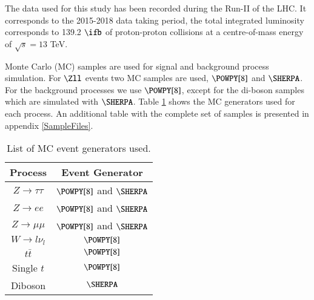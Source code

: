 The data used for this study has been recorded during the Run-II of the LHC. It corresponds to the 2015-2018 data taking period, the total integrated luminosity corresponds to 139.2 $\ifb	$ of proton-proton collisions at a centre-of-mass energy of $\sqrt{s}=13$ TeV.

Monte Carlo (MC) samples are used for signal and background process simulation. For $\Zll$ events two MC samples are used, $\POWPY[8]$ and $\SHERPA$. For the background processes we use $\POWPY[8]$, except for the di-boson samples which are simulated with $\SHERPA$. Table \ref{Table3} shows the MC generators used for each process. An additional table with the complete set of samples is presented in appendix \ref{SampleFiles}.

\begin{table}[htbp]
	\centering
	\begin{tabular}{cc}
		\hline
		\multicolumn{1}{|c|}{Process}  & \multicolumn{1}{c|}{Event Generator} \\ \hline
		$Z\to\tau\tau$                 & $\POWPY[8]$ and $\SHERPA$           \\
		$Z\to ee$                      & $\POWPY[8]$ and $\SHERPA$           \\
		$Z\to\mu\mu$                   & $\POWPY[8]$ and $\SHERPA$           \\
		$W\to l\nu_l$				   & $\POWPY[8]$                       \\
		$t\bar{t}$                     & $\POWPY[8]$                       \\
		Single $t$                     & $\POWPY[8]$                       \\
		Diboson                        & $\SHERPA$                       \\ \hline
	\end{tabular}
	\caption{List of MC event generators used.}
	\label{Table3}
\end{table}